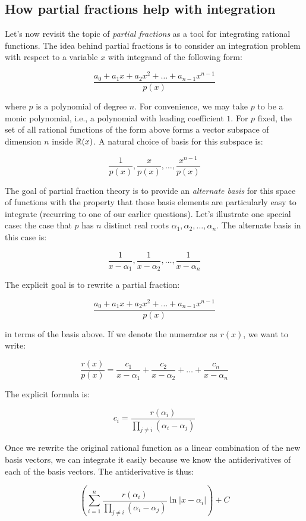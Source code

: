 \documentclass[10pt]{amsart}
\begin{document}
\subsection{How partial fractions help with integration}

Let's now revisit the topic of {\em partial fractions} as a tool for
integrating rational functions. The idea behind partial fractions is
to consider an integration problem with respect to a variable $x$ with
integrand of the following form:

$$\frac{a_0 + a_1x + a_2x^2 + \dots + a_{n-1}x^{n-1}}{p(x)}$$

where $p$ is a polynomial of degree $n$. For convenience, we may take
$p$ to be a monic polynomial, i.e., a polynomial with leading
coefficient $1$. For $p$ fixed, the set of all rational functions of
the form above forms a vector subspace of dimension $n$ inside
$\mathbb{R}(x)$. A natural choice of basis for this subspace is:

$$\frac{1}{p(x)}, \frac{x}{p(x)}, \dots, \frac{x^{n-1}}{p(x)}$$

The goal of partial fraction theory is to provide an {\em alternate
  basis} for this space of functions with the property that those
basis elements are particularly easy to integrate (recurring to one
of our earlier questions). Let's illustrate one special case: the
case that $p$ has $n$ distinct real roots
$\alpha_1,\alpha_2,\dots,\alpha_n$. The alternate basis in this case is:

$$\frac{1}{x - \alpha_1}, \frac{1}{x - \alpha_2}, \dots, \frac{1}{x - \alpha_n}$$

The explicit goal is to rewrite a partial fraction:

$$\frac{a_0 + a_1x + a_2x^2 + \dots + a_{n-1}x^{n-1}}{p(x)}$$

in terms of the basis above. If we denote the numerator as $r(x)$, we want to write:

$$\frac{r(x)}{p(x)} = \frac{c_1}{x - \alpha_1} + \frac{c_2}{x - \alpha_2} + \dots + \frac{c_n}{x - \alpha_n}$$

The explicit formula is:

$$c_i = \frac{r(\alpha_i)}{\prod_{j \ne i} (\alpha_i - \alpha_j)}$$

Once we rewrite the original rational function as a linear
combination of the new basis vectors, we can integrate it easily
because we know the antiderivatives of each of the basis
vectors. The antiderivative is thus:

$$\left(\sum_{i=1}^n \frac{r(\alpha_i)}{\prod_{j \ne i} (\alpha_i - \alpha_j)} \ln|x - \alpha_i|\right) + C$$
\end{document}
